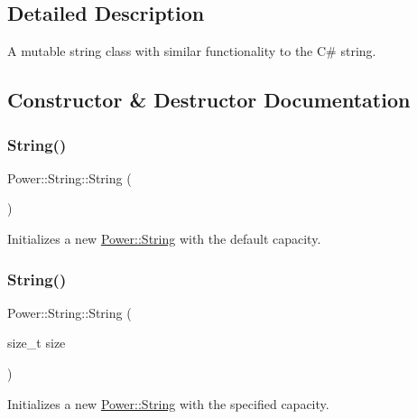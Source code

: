 \subsection{Detailed Description}
A mutable string class with similar functionality to the C\# string. 

\subsection{Constructor \& Destructor Documentation}
\mbox{\label{class_power_1_1_string_a3ae78cdde9e4e81b420277b5581fee8a}} 
\subsubsection{\texorpdfstring{String()}{String()}\hspace{0.1cm}{\footnotesize\ttfamily [1/7]}}
{\footnotesize\ttfamily Power\+::\+String\+::\+String (\begin{DoxyParamCaption}{ }\end{DoxyParamCaption})}



Initializes a new \hyperlink{class_power_1_1_string}{Power\+::\+String} with the default capacity. 

\mbox{\label{class_power_1_1_string_a9384235fbbc6956c166abb265e60db11}} 
\subsubsection{\texorpdfstring{String()}{String()}\hspace{0.1cm}{\footnotesize\ttfamily [2/7]}}
{\footnotesize\ttfamily Power\+::\+String\+::\+String (\begin{DoxyParamCaption}\item[{size\+\_\+t}]{size }\end{DoxyParamCaption})\hspace{0.3cm}{\ttfamily [explicit]}}



Initializes a new \hyperlink{class_power_1_1_string}{Power\+::\+String} with the specified capacity. 


